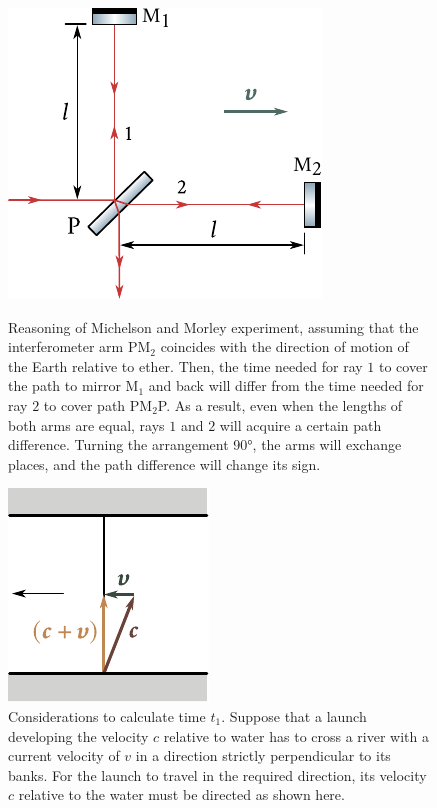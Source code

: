 \begin{figure}[t]
	\begin{minipage}[t]{0.6\linewidth}
		\begin{center}
			\includegraphics[scale=1]{figures/ch_21/fig_21_6.pdf}
            \caption[]{Reasoning of Michelson and Morley experiment, assuming that the interferometer arm PM$_2$ coincides with the direction of motion of the Earth relative to ether. Then, the time needed for ray $1$ to cover the path to mirror M$_1$ and back will differ from the time needed for ray $2$ to cover path PM$_2$P. As a result, even when the lengths of both arms are equal, rays $1$ and $2$ will acquire a certain path difference.
			Turning the arrangement \ang{90}, the arms will exchange places, and the path difference will change its sign.}
			\label{fig:21_6}
		\end{center}
	\end{minipage}
	\hfill{ }%
	\begin{minipage}[t]{0.36\linewidth}
		\begin{center}
			\includegraphics[scale=1]{figures/ch_21/fig_21_7.pdf}
			\caption[]{Considerations to calculate time $t_1$. Suppose that a launch developing the velocity $c$ relative to water has to cross a river with a current velocity of $v$ in a direction strictly perpendicular to its banks. For the launch to travel in the required direction, its velocity $c$ relative to the water must be directed as shown here.}
			\label{fig:21_7}
		\end{center}
	\end{minipage}
\vspace{-0.4cm}
\end{figure}

